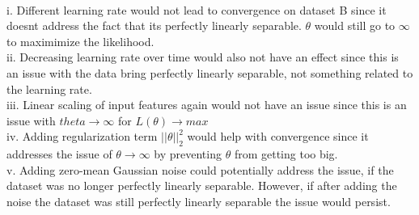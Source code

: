 \begin{answer}\\
i. Different learning rate would not lead to convergence on dataset B since it doesnt address the fact that its perfectly linearly separable. $\theta$ would still go to $\infty$ to maximimize the likelihood.\\
ii. Decreasing learning rate over time would also not have an effect since this is an issue with the data bring perfectly linearly separable, not something related to the learning rate.\\
iii. Linear scaling of input features  again would not have an issue since this is an issue with $theta \rightarrow \infty$ for $L(\theta) \rightarrow max$\\
iv. Adding regularization term $||\theta||_2^2$ would help with convergence since it addresses the issue of $\theta \rightarrow \infty$ by preventing $\theta$ from getting too big.\\
v. Adding zero-mean Gaussian noise could potentially address the issue, if the dataset was no longer perfectly linearly separable. However, if after adding the noise the dataset was still perfectly linearly separable the issue would persist.\\
\end{answer}
